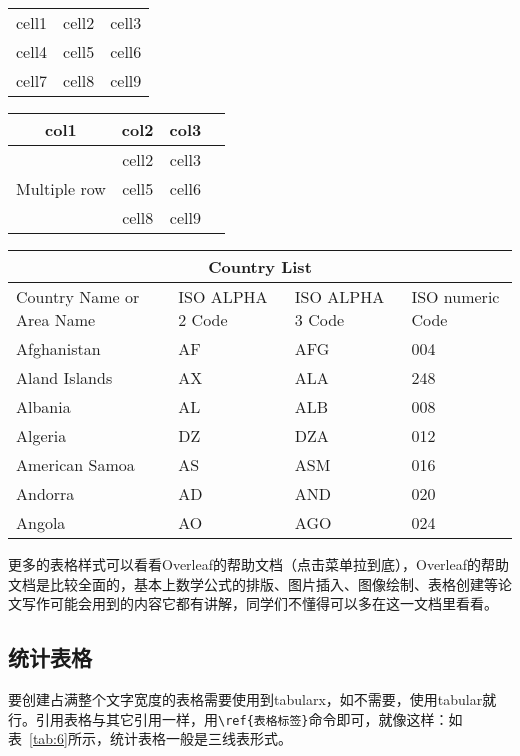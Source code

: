 \begin{table}[ht]
\begin{minipage}[t]{0.45\textwidth}
  \centering
  \label{tab:3}
  \begin{tabular}{ c c c }
 cell1 & cell2 & cell3 \\ 
 cell4 & cell5 & cell6 \\  
 cell7 & cell8 & cell9    
\end{tabular}
\end{minipage}
\begin{minipage}[t]{0.45\textwidth}
\centering
{}
\label{tab:4}
\begin{tabular}{ |c|c|c|c| } 
\hline
col1 & col2 & col3 \\
\hline
\multirow{3}{4em}{Multiple row} & cell2 & cell3 \\ 
& cell5 & cell6 \\ 
& cell8 & cell9 \\ 
\hline
\end{tabular}
\end{minipage}  
\end{table}

\begin{table}[ht]
\centering
{}
\label{tab:5}
\begin{tabular}{ |p{3cm}||p{3cm}|p{3cm}|p{3cm}| }
 \hline
 \multicolumn{4}{|c|}{Country List} \\
 \hline
Country Name or Area Name& ISO ALPHA 2 Code & ISO ALPHA 3 Code & ISO numeric Code \\
 \hline
 Afghanistan   & AF    &AFG&   004\\
 Aland Islands&   AX  & ALA   &248\\
 Albania &AL & ALB&  008\\
 Algeria    &DZ & DZA&  012\\
 American Samoa&   AS  & ASM&016\\
 Andorra& AD  & AND   &020\\
 Angola& AO  & AGO&024\\
 \hline
\end{tabular}
\end{table}

更多的表格样式可以看看Overleaf的帮助文档（点击菜单拉到底），Overleaf的帮助文档是比较全面的，基本上数学公式的排版、图片插入、图像绘制、表格创建等论文写作可能会用到的内容它都有讲解，同学们不懂得可以多在这一文档里看看。

\subsection{统计表格}
要创建占满整个文字宽度的表格需要使用到tabularx，如不需要，使用tabular就行。引用表格与其它引用一样，用\verb|\ref{表格标签}|命令即可，就像这样：如表~\ref{tab:6}所示，统计表格一般是三线表形式。

